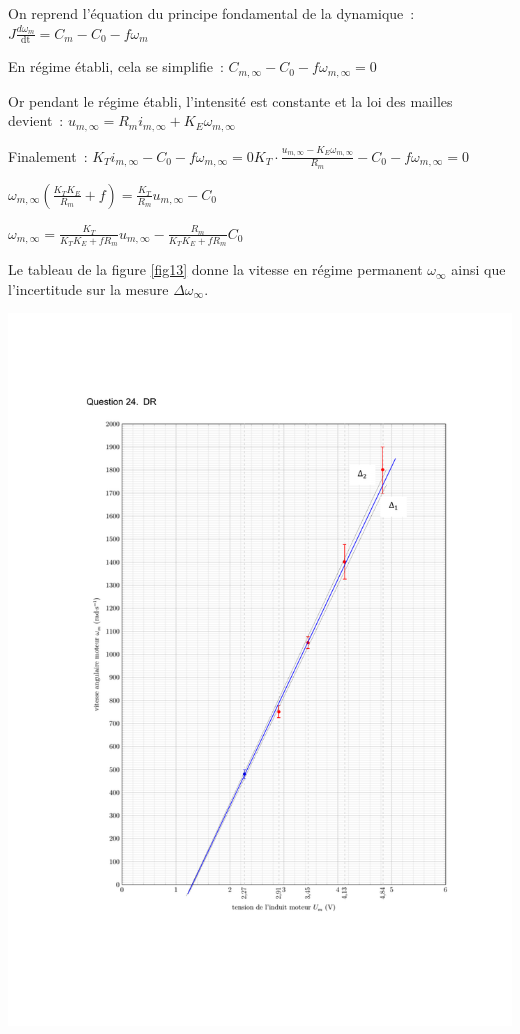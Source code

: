 \ifprof
\begin{corrige}
On reprend l'équation du principe fondamental de la dynamique~: 
\(J\frac{d\omega_{m}}{\text{dt}} = C_{m} - C_{0} - f\omega_{m}\)

En régime établi, cela se simplifie~:
\(C_{m,\infty} - C_{0} - f\omega_{m,\infty} = 0\)

Or pendant le régime établi, l'intensité est constante et la loi des
mailles devient~:
\(u_{m,\infty} = R_{m}i_{m,\infty} + K_{E}\omega_{m,\infty}\)

Finalement~:
\({K_{T}i_{m,\infty} - C_{0} - f\omega_{m,\infty} = 0}\)\({K_{T} \cdot \frac{u_{m,\infty} - K_{E}\omega_{m,\infty}}{R_{m}} - C_{0} - f\omega_{m,\infty} = 0}\)

\({\omega_{m,\infty}\left( \frac{K_{T}K_{E}}{R_{m}} + f \right) = \frac{K_{T}}{R_{m}}u_{m,\infty} - C_{0}}\)

\({\omega_{m,\infty} = \frac{K_{T}}{K_{T}K_{E} + fR_{m}}u_{m,\infty} - \frac{R_{m}}{K_{T}K_{E} + fR_{m}}C_{0}}\)

\end{corrige}
\else
\fi


Le tableau de la figure \ref{fig13} donne la vitesse en régime permanent $\omega_{\infty}$ ainsi que l'incertitude sur la mesure $\Delta \omega_{\infty}$.

\ifprof
\begin{corrige}
\begin{center}
\includegraphics[width=.5\textwidth]{images/courbe_dr_corrige.pdf}
\end{center}
\end{corrige}
\else
\fi


